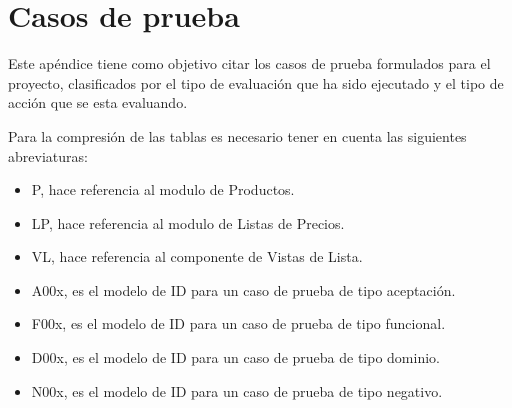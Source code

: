 \chapter{Casos de prueba}
\label{appendix_testscases}
Este apéndice tiene como objetivo citar los casos de prueba formulados para el
proyecto, clasificados por el tipo de evaluación que ha sido ejecutado y el tipo
de acción que se esta evaluando.

Para la compresión de las tablas es necesario tener en cuenta las siguientes
abreviaturas:

\begin{itemize}
    \item P, hace referencia al modulo de Productos.
    \item LP, hace referencia al modulo de Listas de Precios.
    \item VL, hace referencia al componente de Vistas de Lista.
    \item A00x, es el modelo de ID para un caso de prueba de tipo aceptación.
    \item F00x, es el modelo de ID para un caso de prueba de tipo funcional.
    \item D00x, es el modelo de ID para un caso de prueba de tipo dominio.
    \item N00x, es el modelo de ID para un caso de prueba de tipo negativo.
\end{itemize}

